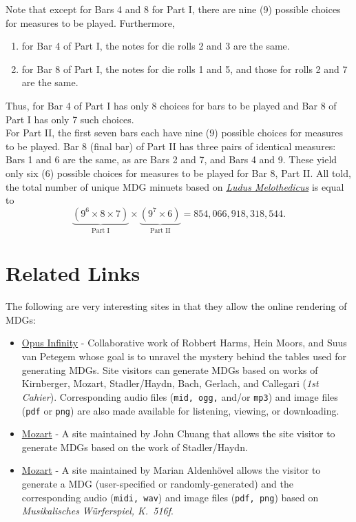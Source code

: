 \documentclass[a4paper,x11names,svgnames,10pt]{article}
\begin{document}
{Note that except for Bars 4 and 8 for Part I, there are nine (9) possible choices for measures to be played.  Furthermore, 
\begin{enumerate}
	\item for Bar 4 of Part I, the notes for die rolls 2 and 3 are the same.
	\item for Bar 8 of Part I, the notes for die rolls 1 and 5, and those for rolls 2 and 7 are the same.
\end{enumerate}
Thus, for Bar 4 of Part I has only 8 choices for bars to be played and Bar 8 of Part I has only 7 such choices. \\

For Part II, the first seven bars each have nine (9) possible choices for measures to be played.  Bar 8 (final bar) of Part II has three pairs of identical measures: Bars 1 and 6 are the same, as are Bars 2 and 7, and Bars 4 and 9.  These yield only six (6) possible choices for measures to be played for Bar 8, Part II. All told, the total number of unique MDG minuets based on \href{https://imslp.org/wiki/Ludus_Melothedicus_(Anonymous)}{\it Ludus Melothedicus} is equal to $$\underbrace{(9^6\times 8\times 7)}_{\text{Part I}} \times \underbrace{(9^7\times 6)}_{\text{Part II}} = 854\!,066\!,918\!,318\!,544.$$

\section{Related Links}
The following are very interesting sites in that they allow the online rendering of MDGs:
\begin{itemize}
	\item \href{https://opus-infinity.org}{Opus Infinity} - Collaborative work of Robbert Harms, Hein Moors, and Suus van Petegem whose goal is to unravel the mystery behind the tables used for generating MDGs.  Site visitors can generate MDGs based on works of Kirnberger, Mozart, Stadler/Haydn, Bach, Gerlach, and Callegari ({\it 1st Cahier}).  Corresponding audio files ({\tt mid, ogg,} and/or {\tt mp3}) and image files ({\tt pdf} or {\tt png}) are also made available for listening, viewing, or downloading.
	
	\item  \href{http://sunsite.univie.ac.at/Mozart/dice/}{Mozart} - A site maintained by John Chuang that allows the site visitor to generate MDGs based on the work of Stadler/Haydn.
	
	\item  \href{https://marian-aldenhoevel.de/mozart/}{Mozart} - A site maintained by Marian Aldenh\"{o}vel allows the visitor to generate a MDG (user-specified or randomly-generated) and the corresponding audio ({\tt midi, wav}) and image files ({\tt pdf, png}) based on {\em Musikalisches W\"{u}rferspiel, K.\ 516f}.
	

\end{itemize}}
\end{document}
